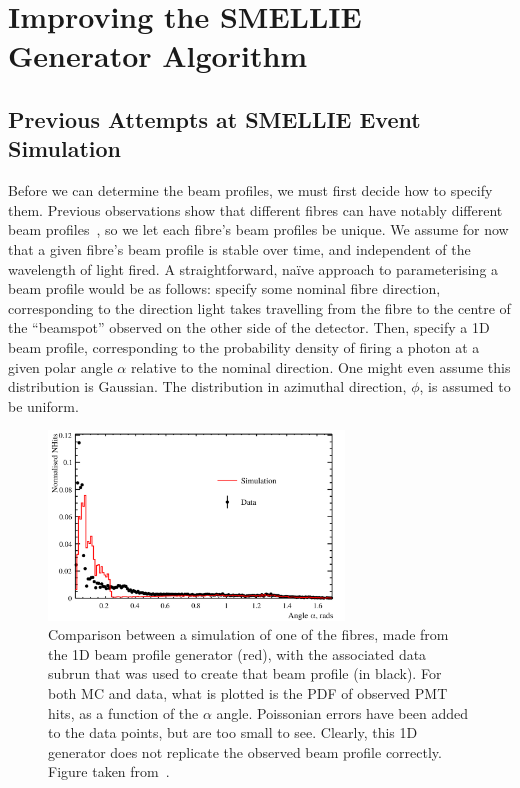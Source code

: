\section{Improving the SMELLIE Generator Algorithm}
\subsection{Previous Attempts at SMELLIE Event Simulation}
Before we can determine the beam profiles, we must first decide how to specify them. Previous observations show that different fibres can have notably different beam profiles~\cite{majumdarMeasurementOpticalScattering2015}, so we let each fibre's beam profiles be unique. We assume for now that a given fibre's beam profile is stable over time, and independent of the wavelength of light fired. A straightforward, na\"{i}ve approach to parameterising a beam profile would be as follows: specify some nominal fibre direction, corresponding to the direction light takes travelling from the fibre to the centre of the ``beamspot'' observed on the other side of the detector. Then, specify a 1D beam profile, corresponding to the probability density of firing a photon at a given polar angle $\alpha$ relative to the nominal direction. One might even assume this distribution is Gaussian. The distribution in azimuthal direction, $\phi$, is assumed to be uniform.

\begin{figure}
    \centering
    \includegraphics[width=0.7\textwidth]{4_SMELLIESimulation/images/1D_gen_plot.png}
    \caption[Comparison of SMELLIE between data and MC using a 1D generator]{Comparison between a simulation of one of the fibres, made from the 1D beam profile generator (red), with the associated data subrun that was used to create that beam profile (in black). For both MC and data, what is plotted is the PDF of observed PMT hits, as a function of the $\alpha$ angle. Poissonian errors have been added to the data points, but are too small to see. Clearly, this 1D generator does not replicate the observed beam profile correctly. Figure taken from~\cite{turnerMeasurementScatteringCharacteristics2022}.}
    \label{fig:1d_gen_plot}
\end{figure}

